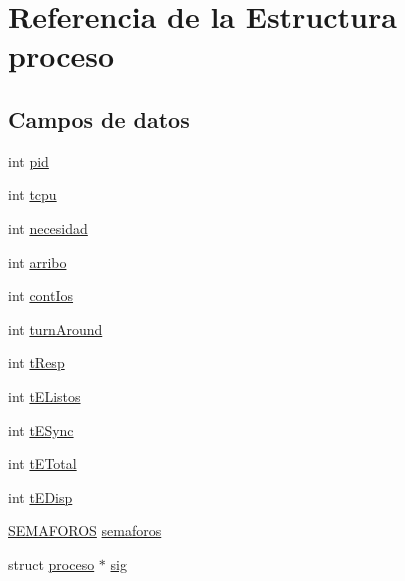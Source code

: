 \hypertarget{structproceso}{\section{Referencia de la Estructura proceso}
\label{structproceso}
}
\subsection*{Campos de datos}
\begin{DoxyCompactItemize}
\item 
int \hyperlink{structproceso_a358bdb0efc4a75e0a843429ef7dfc33e}{pid}
\item 
int \hyperlink{structproceso_a7ec78adcdc6632a7b55b82188b44f76c}{tcpu}
\item 
int \hyperlink{structproceso_afa0af67b38696b6af251c7c6681a51bf}{necesidad}
\item 
int \hyperlink{structproceso_a658e84de456dc77674b4f1a69cfc0eca}{arribo}
\item 
int \hyperlink{structproceso_a55f899909bcb1ffc8b6c0d5e5eed0375}{cont\-Ios}
\item 
int \hyperlink{structproceso_a3e4710976da5407f04ed66ea96843d38}{turn\-Around}
\item 
int \hyperlink{structproceso_a5670b8181b821941450292e6b9088725}{t\-Resp}
\item 
int \hyperlink{structproceso_a261b77df7e4d69192d99695e215def2d}{t\-E\-Listos}
\item 
int \hyperlink{structproceso_a3d8d10b6de4414cfcc790f34596d2992}{t\-E\-Sync}
\item 
int \hyperlink{structproceso_aedc45b7bfd0247a2eae4e75ee8e89e63}{t\-E\-Total}
\item 
int \hyperlink{structproceso_ada33fb9deff92396af71daf15bd7e16e}{t\-E\-Disp}
\item 
\hyperlink{main_8c_a1a51ced83bcd69590e0ff937b704c461}{S\-E\-M\-A\-F\-O\-R\-O\-S} \hyperlink{structproceso_a969f47210353eb94475ffa944761943a}{semaforos}
\item 
struct \hyperlink{structproceso}{proceso} $\ast$ \hyperlink{structproceso_a527a2b7861991b9c7979d5c645352cc2}{sig}
\end{DoxyCompactItemize}


